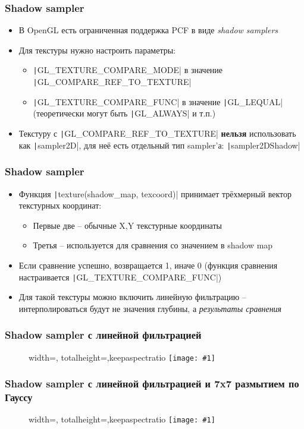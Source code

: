 \documentclass{beamer}
\newcommand{\slideimage}[1]{
  \begin{figure}
    \begin{adjustbox}{width=\textwidth, totalheight=\textheight-2\baselineskip-2\baselineskip,keepaspectratio}
      \texttt{[image: \#1]}
    \end{adjustbox}
  \end{figure}
}
\begin{document}
\begin{frame}[fragile]
\frametitle{Shadow sampler}
\begin{itemize}
\item В OpenGL есть ограниченная поддержка PCF в виде \textit{shadow samplers}
\pause
\item Для текстуры нужно настроить параметры:
\begin{itemize}
\item \texttt|GL_TEXTURE_COMPARE_MODE| в значение \texttt|GL_COMPARE_REF_TO_TEXTURE|
\item \texttt|GL_TEXTURE_COMPARE_FUNC| в значение \texttt|GL_LEQUAL| (теоретически могут быть \texttt|GL_ALWAYS| и т.п.)
\end{itemize}
\pause
\item Текстуру с \texttt|GL_COMPARE_REF_TO_TEXTURE| \textbf{нельзя} использовать как \texttt|sampler2D|, для неё есть отдельный тип sampler'а: \texttt|sampler2DShadow|
\end{itemize}
\end{frame}

\begin{frame}[fragile]
\frametitle{Shadow sampler}
\begin{itemize}
\item Функция \texttt|texture(shadow_map, texcoord)| принимает трёхмерный вектор текстурных координат:
\begin{itemize}
\item Первые две -- обычные X,Y текстурные координаты
\item Третья -- используется для сравнения со значением в shadow map
\end{itemize}
\pause
\item Если сравнение успешно, возвращается 1, иначе 0 (функция сравнения настраивается \texttt|GL_TEXTURE_COMPARE_FUNC|)
\pause
\item Для такой текстуры можно включить линейную фильтрацию -- интерполироваться будут не значения глубины, а \textit{результаты сравнения}
\end{itemize}
\end{frame}

\begin{frame}[fragile]
\frametitle{Shadow sampler с линейной фильтрацией}
\slideimage{pcf.png}
\end{frame}

\begin{frame}[fragile]
\frametitle{Shadow sampler с линейной фильтрацией и 7x7 размытием по Гауссу}
\slideimage{pcf_gauss.png}
\end{frame}
\end{document}
